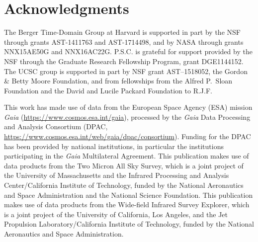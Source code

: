 \section*{Acknowledgments}
The Berger Time-Domain Group at Harvard is supported in part by the NSF through grants AST-1411763 and AST-1714498, and by NASA through grants NNX15AE50G and NNX16AC22G. P.S.C. is grateful for support provided by the NSF
through the Graduate Research Fellowship Program, grant DGE1144152. The UCSC group is supported in part by NSF grant AST--1518052, the Gordon \& Betty Moore Foundation, and from fellowships from the Alfred P.\ Sloan Foundation and the David and Lucile Packard Foundation to R.J.F. 

This work has made use of data from the European Space Agency (ESA)
mission {\it Gaia} (\url{https://www.cosmos.esa.int/gaia}), processed by
the {\it Gaia} Data Processing and Analysis Consortium (DPAC,
\url{https://www.cosmos.esa.int/web/gaia/dpac/consortium}). Funding
for the DPAC has been provided by national institutions, in particular
the institutions participating in the {\it Gaia} Multilateral Agreement.
This publication makes use of data products from the Two Micron All Sky Survey, 
which is a joint project of the University of Massachusetts and the Infrared Processing 
and Analysis Center/California Institute of Technology, funded by the National Aeronautics 
and Space Administration and the National Science Foundation. This publication makes use 
of data products from the Wide-field Infrared Survey Explorer, which is a joint project of the 
University of California, Los Angeles, and the Jet Propulsion Laboratory/California Institute of 
Technology, funded by the National Aeronautics and Space Administration.

